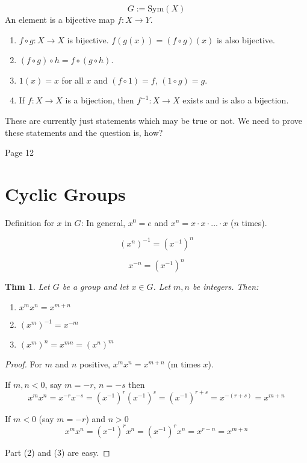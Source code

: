 \documentclass{article}
\begin{document}
\[
G := \text{Sym}(X)
\]
An element is a bijective map $f: X \to Y$.
\begin{enumerate}
    \item $f \circ g: X \to X$ is bijective. $f(g(x)) = (f \circ g)(x)$ is also bijective.
    \item $(f \circ g) \circ h = f \circ (g \circ h)$.
    \item $1(x) = x$ for all $x$ and $(f \circ 1) = f$, $(1 \circ g) = g$.
    \item If $f: X \to X$ is a bijection, then $f^{-1}: X \to X$ exists and is also a bijection.
\end{enumerate}

These are currently just statements which may be true or not.
We need to prove these statements and the question is, how?

\newpage
\begin{flushleft}
    Page 12
\end{flushleft}
\section*{Cyclic Groups}
Definition for $x$ in $G$:
In general, $x^0 = e$ and $x^n = x \cdot x \cdot \ldots \cdot x$ ($n$ times).

\[
(x^n)^{-1} = (x^{-1})^n
\]

\[
x^{-n} = (x^{-1})^n
\]

\newtheorem*{theorem}{Thm}
\begin{theorem}
    Let $G$ be a group and let $x \in G$. Let $m, n$ be integers. Then:
    \begin{enumerate}
        \item $x^m x^n = x^{m+n}$
        \item $(x^m)^{-1} = x^{-m}$
        \item $(x^m)^n = x^{mn} = (x^n)^m$
    \end{enumerate}
\end{theorem}

\begin{proof}
    For $m$ and $n$ positive, $x^m x^n = x^{m+n}$ (m times $x$).

    If $m, n < 0$, say $m = -r$, $n = -s$ then
    \[
    x^m x^n = x^{-r} x^{-s} = (x^{-1})^r (x^{-1})^s = (x^{-1})^{r+s} = x^{-(r+s)} = x^{m+n}
    \]

    If $m < 0$ (say $m = -r$) and $n > 0$
    \[
    x^m x^n = (x^{-1})^r x^n = (x^{-1})^r x^n = x^{r-n} = x^{m+n}
    \]

    Part (2) and (3) are easy.
\end{proof}
\end{document}
